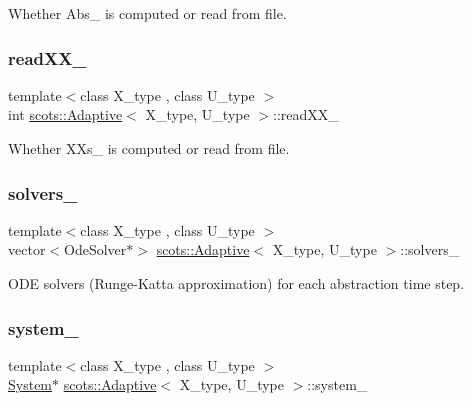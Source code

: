 Whether Abs\+\_\+ is computed or read from file. \mbox{\label{classscots_1_1Adaptive_a95926f102459b6ec3525040c791ff359}} 
\subsubsection{\texorpdfstring{read\+X\+X\+\_\+}{readXX\_}}
{\footnotesize\ttfamily template$<$class X\+\_\+type , class U\+\_\+type $>$ \\
int \hyperlink{classscots_1_1Adaptive}{scots\+::\+Adaptive}$<$ X\+\_\+type, U\+\_\+type $>$\+::read\+X\+X\+\_\+}

Whether X\+Xs\+\_\+ is computed or read from file. \mbox{\label{classscots_1_1Adaptive_a0b300511b5f746c7b24ead30dc0ca9ac}} 
\subsubsection{\texorpdfstring{solvers\+\_\+}{solvers\_}}
{\footnotesize\ttfamily template$<$class X\+\_\+type , class U\+\_\+type $>$ \\
vector$<$Ode\+Solver$\ast$$>$ \hyperlink{classscots_1_1Adaptive}{scots\+::\+Adaptive}$<$ X\+\_\+type, U\+\_\+type $>$\+::solvers\+\_\+}

O\+DE solvers (Runge-\/\+Katta approximation) for each abstraction time step. \mbox{\label{classscots_1_1Adaptive_a3c9f6e3b1ae0c7bcabeafb28732d67ab}} 
\subsubsection{\texorpdfstring{system\+\_\+}{system\_}}
{\footnotesize\ttfamily template$<$class X\+\_\+type , class U\+\_\+type $>$ \\
\hyperlink{classscots_1_1System}{System}$\ast$ \hyperlink{classscots_1_1Adaptive}{scots\+::\+Adaptive}$<$ X\+\_\+type, U\+\_\+type $>$\+::system\+\_\+}

